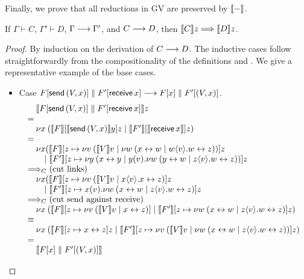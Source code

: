 \documentclass[oribibl,orivec,envcountsame]{llncs}
\begin{document}
Finally, we prove that all reductions in GV are preserved by $\llbracket - \rrbracket$.
%
\begin{theorem}
\label{thm:gv-reduction-simulated}
If $\Gamma \vdash C$, $\Gamma' \vdash D$, $\Gamma \longrightarrow \Gamma'$, and $C \longrightarrow D$, then $\llbracket C \rrbracket z
\Longrightarrow \llbracket D \rrbracket z$.
\end{theorem}
\begin{proof}
  By induction on the derivation of $C \longrightarrow D$. The inductive cases follow straightforwardly from
  the compositionality of the definitions and . We give a representative
  example of the base cases.
\begin{itemize}
\item Case $F[\mathsf{send} \, (V,x)] \parallel F'[\mathsf{receive} \, x] \longrightarrow F[x]
  \parallel F'[(V,x)]$.
%
\[
\bl
\quad \tocp{\Fx[\gvconst{send} \app (V,x)] \parallel \Fx'[\gvconst{receive} \app x]}z \\
= \\
\quad \cut{x}{}
        {\tocp{\Fx}[\tocp{\gvconst{send} \app (V,x)}y]z}
        {\tocp{\Fx'}[\tocp{\gvconst{receive} \app x}]z} \\
= \\
\quad
  \nu x(
    {\tocp{\Fx}
      [z \mapsto \cut{v}{}{\tocp{V}v}
        {\cut{w}{}{\link{x}{w}}{w\sd{v}.\link{w}{z}}}]z} \\
\qquad \mid
    {\tocp{\Fx'}
       [z \mapsto \cut{y}{}
          {\link{x}{y}}
          {y(v).\cut{w}{}{\link{y}{w}}{z\sd{v}.\link{w}{z}}}]z} \\
\bigcrto (\text{cut links}) \\
\quad
  \nu x(
    {\tocp{\Fx}
       [z \mapsto \cut{v}{}{\tocp{V}v}
         {x\sd{v}.\link x z}]z} \\
\qquad \mid
    {\tocp{\Fx'}
       [z \mapsto x(v).\cut{w}{}{\link{x}{w}}{z\sd{v}.\link{w}{z}}]z} \\
\bigcrto (\text{cut send against receive}) \\
\quad
  \cut{x}{}
    {\tocp{\Fx}
       [z \mapsto
         \cut{v}{}{\tocp{V}v}{\link x z}]}
    {\tocp{\Fx'}
       [z \mapsto \cut{w}{}{\link{x}{w}}{z\sd{v}.\link{w}{z}}]z} \\
\equiv \\
\quad
  \cut{x}{}
    {\tocp{\Fx}[z \mapsto \link x z]z}
    {\tocp{\Fx'}[z \mapsto
      \cut{v}{}{\tocp{V}v}
        {\cut{w}{}{\link{x}{w}}
          {z\sd{v}.\link{w}{z}}}]z} \\
= \\
\quad \tocp{\Fx[x] \parallel \Fx'[(V,x)]} \\
\el
\]


\end{itemize}
\end{proof}
\end{document}
